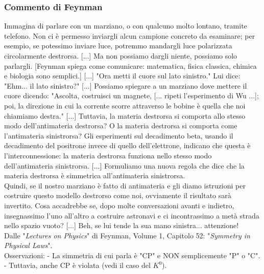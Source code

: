 \subsubsection{Commento di Feynman}
Immagina di parlare con un marziano, o con qualcuno molto lontano, tramite telefono. Non ci è permesso inviargli alcun campione concreto da esaminare; per esempio, se potessimo inviare luce, potremmo mandargli luce polarizzata circolarmente destrorsa. [...] Ma non possiamo dargli niente, possiamo solo parlargli.  
[Feynman spiega come comunicare: matematica, fisica classica, chimica e biologia sono semplici.]  
[...] "Ora metti il cuore sul lato sinistro." Lui dice: "Ehm... il lato sinistro?" [...] Possiamo spiegare a un marziano dove mettere il cuore dicendo: "Ascolta, costruisci un magnete, [... ripeti l'esperimento di Wu ...]; poi, la direzione in cui la corrente scorre attraverso le bobine è quella che noi chiamiamo destra."  
[...] Tuttavia, la materia destrorsa si comporta allo stesso modo dell'antimateria destrorsa? O la materia destrorsa si comporta come l'antimateria sinistrorsa? Gli esperimenti sul decadimento beta, usando il decadimento del positrone invece di quello dell'elettrone, indicano che questa è l'interconnessione: la materia destrorsa funziona nello stesso modo dell'antimateria sinistrorsa.  
[...] Formuliamo una nuova regola che dice che la materia destrorsa è simmetrica all'antimateria sinistrorsa. \\ 
Quindi, se il nostro marziano è fatto di antimateria e gli diamo istruzioni per costruire questo modello destrorso come noi, ovviamente il risultato sarà invertito. Cosa accadrebbe se, dopo molte conversazioni avanti e indietro, insegnassimo l'uno all'altro a costruire astronavi e ci incontrassimo a metà strada nello spazio vuoto? [...]  
Beh, se lui tende la sua mano sinistra... attenzione!  \\
Dalle "\textit{Lectures on Physics}" di Feynman, Volume 1, Capitolo 52: "\textit{Symmetry in Physical Laws}".\\ 

Osservazioni:
- La simmetria di cui parla è "CP" e NON semplicemente "P" o "C".  
- Tuttavia, anche CP è violata (vedi il caso del \(K^0\)).
